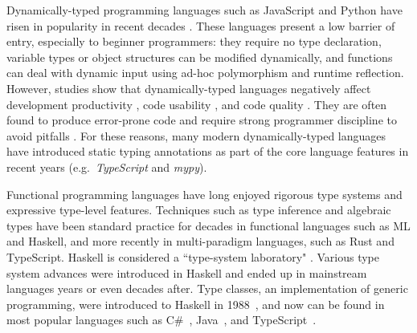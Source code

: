 


Dynamically-typed programming languages such as JavaScript and Python have risen in popularity in recent decades \cite{chatley_next_2019}. These languages present a low barrier of entry, especially to beginner programmers: they require no type declaration, variable types or object structures can be modified dynamically, and functions can deal with dynamic input using ad-hoc polymorphism and runtime reflection. However, studies show that dynamically-typed languages negatively affect development productivity \cite{kleinschmager_static_2012}, code usability \cite{mayer_empirical_2012}, and code quality \cite{gao_type_2017, ray_large-scale_2017, meyerovich_empirical_2013}. They are often found to produce error-prone code \cite{chen_empirical_2020, wang_empirical_2015,xu_python_2016} and require strong programmer discipline to avoid pitfalls \cite{chen_empirical_2020}. For these reasons, many modern dynamically-typed languages have introduced static typing annotations as part of the core language features in recent years (e.g.\ \textit{TypeScript} and \textit{mypy}).

Functional programming languages have long enjoyed rigorous type systems and expressive type-level features. Techniques such as type inference and algebraic types have been standard practice for decades in functional languages such as ML and Haskell, and more recently in multi-paradigm languages, such as Rust and TypeScript. Haskell is considered a ``type-system laboratory" \cite{hudak_history_2007}. Various type system advances were introduced in Haskell and ended up in mainstream languages years or even decades after. Type classes, an implementation of generic programming, were introduced to Haskell in 1988~\cite{hudak_history_2007}, and now can be found in most popular languages such as C\#~\cite{bill_wagner_constraints_2022}, Java~\cite{oracle_generic_2022}, and TypeScript~\cite{microsoft_documentation_2022}.


